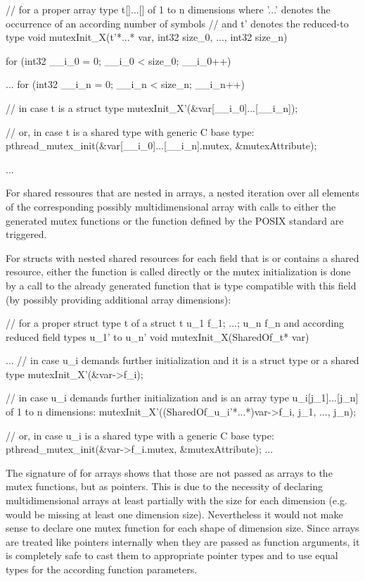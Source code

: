 \begin{ccode}
// for a proper array type t[]...[] of 1 to n dimensions where '...' denotes the occurrence of an according number of symbols 
// and t' denotes the reduced-to type
void mutexInit_X(t'*...* var, int32 size_0, ..., int32 size_n) { 
  for (int32 __i_0 = 0; __i_0 < size_0; __i_0++) { 
    ...
      for (int32 __i_n = 0; __i_n < size_n; __i_n++) {
        // in case t is a struct type
        mutexInit_X'(&var[__i_0]...[__i_n]);
        
        // or, in case t is a shared type with generic C base type:
        pthread_mutex_init(&var[__i_0]...[__i_n].mutex, &mutexAttribute);
      }
    ...
  } 
}
\end{ccode}
For shared ressoures that are nested in arrays, a nested iteration over all elements of the corresponding possibly multidimensional array with calls to either the generated mutex functions or the function defined by the POSIX standard are triggered.

For structs with nested shared resources for each field that is or contains a shared resource, either the  function is called directly or the mutex initialization is done by a call to the already generated function that is type compatible with this field (by possibly providing additional array dimensions):

\begin{ccode}
// for a proper struct type t of a struct t { u_1 f_1; ...; u_n f_n } and according reduced field types u_1' to u_n'
void mutexInit_X(SharedOf_t* var) {
  ...
  // in case u_i demands further initialization and it is a struct type or a shared type
  mutexInit_X'(&var->f_i);
  
  // in case u_i demands further initialization and is an array type u_i[j_1]...[j_n] of 1 to n dimensions:
  mutexInit_X'((SharedOf_u_i'*...*)var->f_i, j_1, ..., j_n);
  
  // or, in case u_i is a shared type with a generic C base type:
  pthread_mutex_init(&var->f_i.mutex, &mutexAttribute);
  ...
}
\end{ccode}
The signature of  for arrays shows that those are not passed as arrays to the mutex functions, but as pointers. This is due to the necessity of declaring multidimensional arrays at least partially with the size for each dimension (e.g.  would be missing at least one dimension size). Nevertheless it would not make sense to declare one mutex function for each shape of dimension size. Since arrays are treated like pointers internally when they are passed as function arguments, it is completely safe to cast them to appropriate pointer types and to use equal types for the according function parameters.

